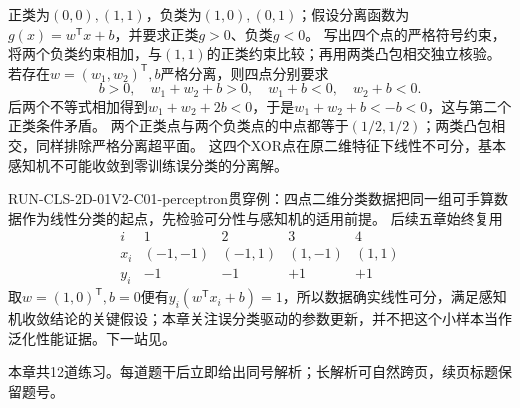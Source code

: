 \label{struct:V2-C01-CH33}
\begin{solution}
\SolGiven 正类为$(0,0),(1,1)$，负类为$(1,0),(0,1)$；假设分离函数为$g(x)=w^{\mathsf T}x+b$，并要求正类$g>0$、负类$g<0$。
\SolPlan 写出四个点的严格符号约束，将两个负类约束相加，与$(1,1)$的正类约束比较；再用两类凸包相交独立核验。
\SolDerive
若存在$w=(w_1,w_2)^{\mathsf T},b$严格分离，则四点分别要求
\[
b>0,\quad w_1+w_2+b>0,\quad w_1+b<0,\quad w_2+b<0.
\]
后两个不等式相加得到$w_1+w_2+2b<0$，于是$w_1+w_2+b<-b<0$，这与第二个正类条件矛盾。
\SolCheck 两个正类点与两个负类点的中点都等于$(1/2,1/2)$；两类凸包相交，同样排除严格分离超平面。
\SolAnswer 这四个XOR点在原二维特征下线性不可分，基本感知机不可能收敛到零训练误分类的分离解。
\end{solution}

\begin{SLRunningExample}{RUN-CLS-2D-01}{V2-C01-perceptron}{贯穿例：四点二维分类数据}{把同一组可手算数据作为线性分类的起点，先检验可分性与感知机的适用前提。}
后续五章始终复用
\[
\begin{array}{c|cccc}
i&1&2&3&4\\ \hline
x_i&(-1,-1)&(-1,1)&(1,-1)&(1,1)\\
y_i&-1&-1&+1&+1
\end{array}
\]
取$w=(1,0)^{\mathsf T},b=0$便有$y_i(w^{\mathsf T}x_i+b)=1$，所以数据确实线性可分，满足感知机收敛结论的关键假设；本章关注误分类驱动的参数更新，并不把这个小样本当作泛化性能证据。下一站见。
\end{SLRunningExample}


\label{struct:V2-C01-CH34}
\begin{chapterexercisebox}
\label{struct:V2-C01-CH35}
本章共12道练习。每道题干后立即给出同号解析；长解析可自然跨页，续页标题保留题号。
\end{chapterexercisebox}

